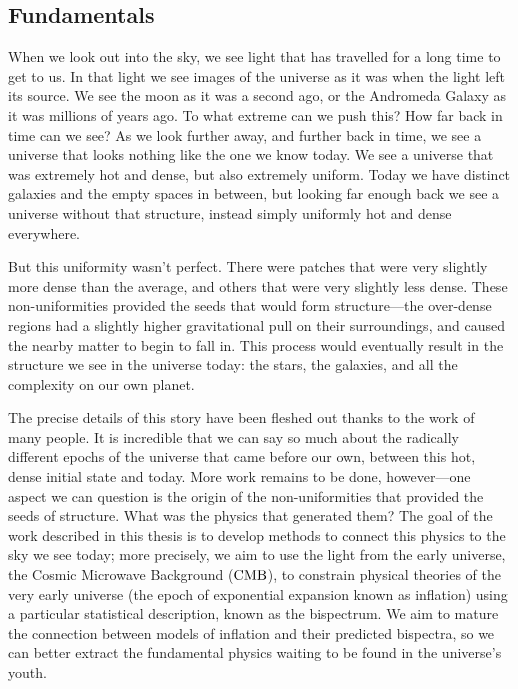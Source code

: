     \subsection{Fundamentals}
When we look out into the sky, we see light that has travelled for a long time to get to us.
In that light we see images of the universe as it was when the light left its source.
We see the moon as it was a second ago, or the Andromeda Galaxy as it was millions of
years ago. To what extreme can we push this? How far back in time can we see? As we look further
away, and further back in time, we see a universe that looks nothing like the one we know today.
We see a universe that was extremely hot and dense, but also extremely uniform. Today
we have distinct galaxies and the empty spaces in between, but looking far enough back we see a universe
without that structure, instead simply uniformly hot and dense everywhere.


But this uniformity wasn't perfect. There were patches that were very slightly more dense than the average,
and others that were very slightly less dense. These non-uniformities provided the seeds that would form
structure---the over-dense regions had a slightly higher gravitational pull on their surroundings,
and caused the nearby matter to begin to fall in. This process would eventually result in the structure
we see in the universe today: the stars, the galaxies, and all the complexity on our own planet.


The precise details of this story have been fleshed out thanks to the work of many people.
It is incredible that we can say so much about the radically different epochs of the universe that came before our own,
between this hot, dense initial state and today.
More work remains to be done, however---one aspect we can question is the origin of the non-uniformities
that provided the seeds of structure. What was the physics that generated them?
The goal of the work described in this thesis is to develop methods to connect this physics
to the sky we see today; more precisely, we aim to use the light from
the early universe, the Cosmic Microwave Background ($\text{CMB}$),
to constrain physical theories of the very early universe (the epoch of exponential
expansion known as inflation) using a particular
statistical description, known as the bispectrum.
We aim to mature the connection between models of inflation and their predicted bispectra, so we can better
extract the fundamental physics waiting to be found in the universe's youth.


